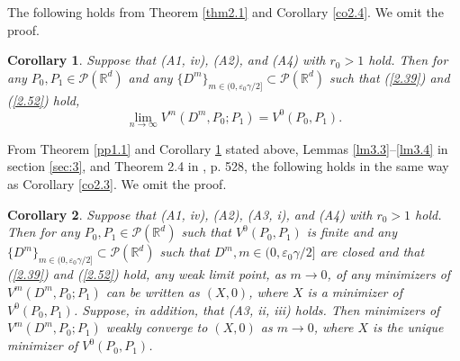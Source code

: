 \documentclass[12pt]{article}
\newtheorem{corollary}{Corollary}[section]
\begin{document}
The following holds from Theorem \ref {thm2.1} and Corollary \ref{co2.4}.
We omit the proof.

\begin{corollary}\label {co2.5}
Suppose that (A1, iv), (A2), and (A4) with $r_0>1$ hold.
Then for any $P_0,P_1\in\mathcal{P}(\mathbb{R}^d)$ and 
any $\{D^m\}_{m\in (0, \varepsilon_0\gamma/2]}\subset \mathcal{P}(\mathbb{R}^d)$ such that 
(\ref{2.39}) and (\ref{2.52}) hold,
\begin{equation}
\lim_{n\to \infty}V^{m}(D^m,P_0;P_1)=V^0(P_0,P_1).
\end{equation}
\end{corollary}

From Theorem \ref{pp1.1} and Corollary \ref{co2.5} stated above, 
Lemmas  \ref{lm3.3}--\ref{lm3.4} in section \ref{sec:3}, and Theorem 2.4 in \cite{2-JS}, p. 528, 
the following holds in the same way as Corollary \ref{co2.3}.
We omit the proof.

\begin{corollary}\label {co2.6}
Suppose that (A1, iv), (A2), (A3, i), and (A4) with $r_0>1$ hold.
Then for any $P_0,P_1\in \mathcal{P}(\mathbb{R}^d )$ such that $V^0(P_0,P_1)$ is finite and 
any $\{D^m\}_{m\in (0, \varepsilon_0\gamma/2]}\subset \mathcal{P}(\mathbb{R}^d)$ 
such that $D^m, m\in (0, \varepsilon_0\gamma/2]$ are closed and
 that (\ref{2.39}) and (\ref{2.52}) hold,
any weak limit point, as $m\to 0$, of
any minimizers of $V^m(D^m,P_0;P_1)$ can be written as $(X, 0)$, where $X$ is a minimizer of
$V^0(P_0,P_1)$. 
Suppose, in addition, that (A3, ii, iii) holds. Then minimizers of $V^m(D^m,P_0;P_1)$
weakly converge to $(X, 0)$ as $m\to 0$, where $X$ is the unique minimizer of $V^0(P_0,P_1)$.
\end{corollary}


\end{document}
